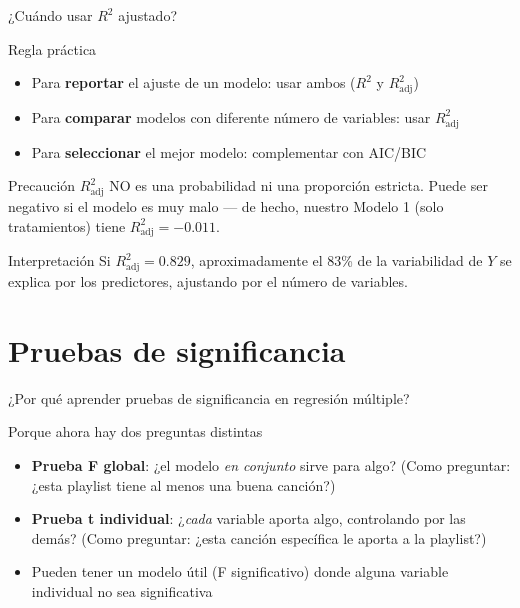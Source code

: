 \documentclass[aspectratio=169, 11pt]{beamer}
\begin{document}
\begin{frame}{¿Cuándo usar $R^2$ ajustado?}
\begin{block}{Regla práctica}
\begin{itemize}
  \item Para \textbf{reportar} el ajuste de un modelo: usar ambos ($R^2$ y $R^2_{\text{adj}}$)
  \item Para \textbf{comparar} modelos con diferente número de variables: usar $R^2_{\text{adj}}$
  \item Para \textbf{seleccionar} el mejor modelo: complementar con AIC/BIC
\end{itemize}
\end{block}

\vspace{0.2cm}
\begin{alertblock}{Precaución}
$R^2_{\text{adj}}$ NO es una probabilidad ni una proporción estricta. Puede ser negativo si el modelo es muy malo --- de hecho, nuestro Modelo 1 (solo tratamientos) tiene $R^2_{\text{adj}} = -0.011$.
\end{alertblock}

\vspace{0.2cm}
\begin{exampleblock}{Interpretación}
Si $R^2_{\text{adj}} = 0.829$, aproximadamente el 83\% de la variabilidad de $Y$ se explica por los predictores, ajustando por el número de variables.
\end{exampleblock}
\end{frame}

\section{Pruebas de significancia}

\begin{frame}{¿Por qué aprender pruebas de significancia en regresión múltiple?}
\begin{exampleblock}{Porque ahora hay dos preguntas distintas}
\small
\begin{itemize}\setlength{\itemsep}{2pt}
  \item \textbf{Prueba F global}: ¿el modelo \textit{en conjunto} sirve para algo? (Como preguntar: ¿esta playlist tiene al menos una buena canción?)
  \item \textbf{Prueba t individual}: ¿\textit{cada} variable aporta algo, controlando por las demás? (Como preguntar: ¿esta canción específica le aporta a la playlist?)
  \item Pueden tener un modelo útil (F significativo) donde alguna variable individual no sea significativa
\end{itemize}
\end{exampleblock}
\end{frame}
\end{document}
